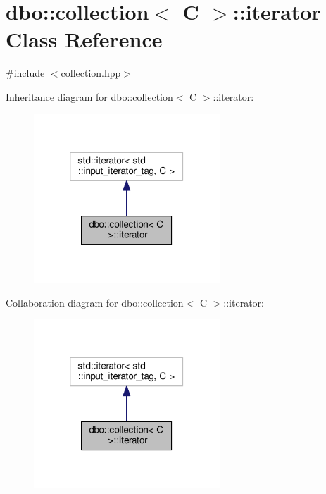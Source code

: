\hypertarget{classdbo_1_1collection_1_1iterator}{\section{dbo\+:\+:collection$<$ C $>$\+:\+:iterator Class Reference}
\label{classdbo_1_1collection_1_1iterator}
}


{\ttfamily \#include $<$collection.\+hpp$>$}



Inheritance diagram for dbo\+:\+:collection$<$ C $>$\+:\+:iterator\+:\nopagebreak
\begin{figure}[H]
\begin{center}
\leavevmode
\includegraphics[width=198pt]{classdbo_1_1collection_1_1iterator__inherit__graph}
\end{center}
\end{figure}


Collaboration diagram for dbo\+:\+:collection$<$ C $>$\+:\+:iterator\+:\nopagebreak
\begin{figure}[H]
\begin{center}
\leavevmode
\includegraphics[width=198pt]{classdbo_1_1collection_1_1iterator__coll__graph}
\end{center}
\end{figure}
